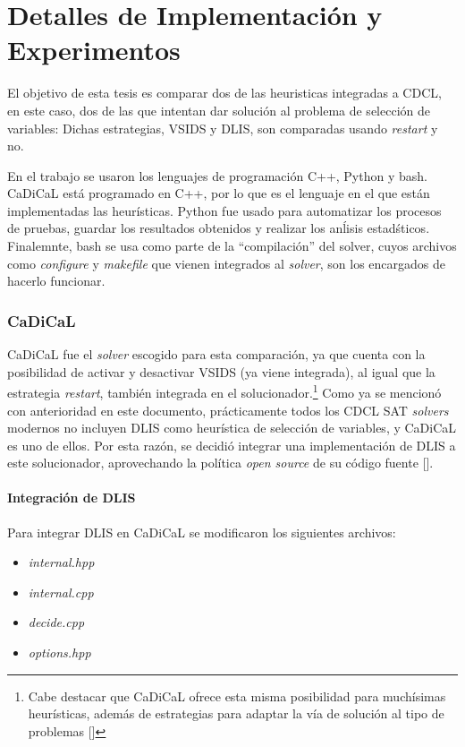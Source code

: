 \chapter{Detalles de Implementación y Experimentos}
\label{chapter:implementation}
El objetivo de esta tesis es comparar dos de las heuristicas integradas a CDCL, en este caso, dos de las que intentan dar soluci\'on al problema de selecci\'on de variables: Dichas estrategias, VSIDS y DLIS, son comparadas usando \textit{restart} y no.

En el trabajo se usaron los lenguajes de programaci\'on C++, Python y bash. CaDiCaL est\'a programado en C++, por lo que es el lenguaje en el que est\'an implementadas las heur\'isticas. Python fue usado para automatizar los procesos de pruebas, guardar los resultados obtenidos y realizar los an\'lisis estad\'sticos. Finalemnte, bash se usa como parte de la ``compilaci\'on'' del solver, cuyos archivos como \textit{configure} y \textit{makefile} que vienen integrados al \textit{solver}, son los encargados de hacerlo funcionar.

\subsection{CaDiCaL}
CaDiCaL fue el \textit{solver} escogido para esta comparaci\'on, ya que cuenta con la posibilidad de activar y desactivar VSIDS (ya viene integrada), al igual que la estrategia \textit{restart}, tambi\'en integrada en el solucionador.\footnote{Cabe destacar que CaDiCaL ofrece esta misma posibilidad para much\'isimas heur\'isticas, adem\'as de estrategias para adaptar la v\'ia de soluci\'on al tipo de problemas [\cite{cadical2024}]} Como ya se mencion\'o con anterioridad en este documento, pr\'acticamente todos los CDCL SAT \textit{solvers} modernos no incluyen DLIS como heur\'istica de selecci\'on de variables, y CaDiCaL es uno de ellos. Por esta raz\'on, se decidi\'o integrar una implementaci\'on de DLIS a este solucionador, aprovechando la pol\'itica \textit{open source} de su c\'odigo fuente [\cite{cadical2024}].%

\subsubsection{Integraci\'on de DLIS}
Para integrar DLIS en CaDiCaL se modificaron los siguientes archivos:
\begin{itemize}
    \item \textit{internal.hpp}
    \item \textit{internal.cpp}
    \item \textit{decide.cpp}
    \item \textit{options.hpp}
\end{itemize}

